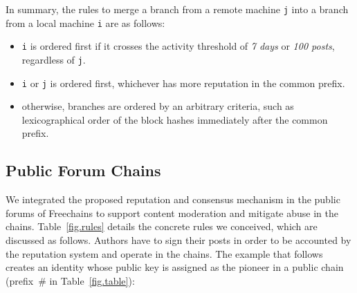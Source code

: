 \documentclass[10pt,journal,compsoc]{IEEEtran}
\newcommand{\FC}       {Freechains\xspace}
\newcommand{\code}[1]  {\texttt{\footnotesize{#1}}}
\begin{document}
In summary, the rules to merge a branch from a remote machine \code{j} into a
branch from a local machine \code{i} are as follows:
\begin{itemize}
    \item \code{i} is ordered first if it crosses the activity threshold of
          \emph{7 days} or \emph{100 posts}, regardless of \code{j}.
    \item \code{i} or \code{j} is ordered first, whichever has more reputation
          in the common prefix.
    \item otherwise, branches are ordered by an arbitrary criteria, such as
          lexicographical order of the block hashes immediately after the
          common prefix.
\end{itemize}

\subsection{Public Forum Chains}
\label{sec.consensus.chains}

We integrated the proposed reputation and consensus mechanism in the public
forums of \FC to support content moderation and mitigate abuse in the chains.
Table~\ref{fig.rules} details the concrete rules we conceived, which are
discussed as follows.
Authors have to sign their posts in order to be accounted by the reputation
system and operate in the chains.
The example that follows creates an identity whose public key is assigned as
the pioneer in a public chain (prefix~$\#$ in Table~\ref{fig.table}):
\end{document}

